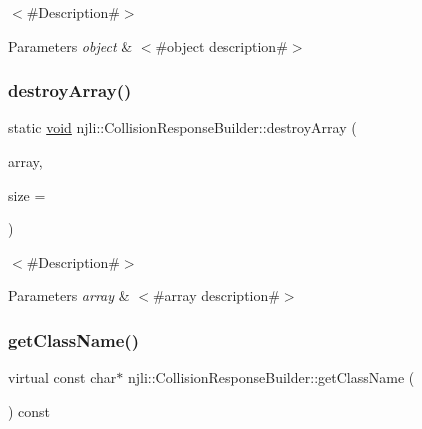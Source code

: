$<$\#\+Description\#$>$


\begin{DoxyParams}{Parameters}
{\em object} & $<$\#object description\#$>$ \\
\hline
\end{DoxyParams}
\mbox{\label{classnjli_1_1_collision_response_builder_aa7f266a43e3f731c87c81cf79212f639}} 
\subsubsection{\texorpdfstring{destroy\+Array()}{destroyArray()}}
{\footnotesize\ttfamily static \mbox{\hyperlink{_thread_8h_af1e856da2e658414cb2456cb6f7ebc66}{void}} njli\+::\+Collision\+Response\+Builder\+::destroy\+Array (\begin{DoxyParamCaption}\item[{\mbox{\hyperlink{classnjli_1_1_collision_response_builder}{Collision\+Response\+Builder}} $\ast$$\ast$}]{array,  }\item[{const \mbox{\hyperlink{_util_8h_a10e94b422ef0c20dcdec20d31a1f5049}{u32}}}]{size = {} }\end{DoxyParamCaption})\hspace{0.3cm}{\ttfamily [static]}}

$<$\#\+Description\#$>$


\begin{DoxyParams}{Parameters}
{\em array} & $<$\#array description\#$>$ \\
\hline
\end{DoxyParams}
\mbox{\label{classnjli_1_1_collision_response_builder_a50bd8b21b5a15b5459e830e865277f64}} 
\subsubsection{\texorpdfstring{get\+Class\+Name()}{getClassName()}}
{\footnotesize\ttfamily virtual const char$\ast$ njli\+::\+Collision\+Response\+Builder\+::get\+Class\+Name (\begin{DoxyParamCaption}{ }\end{DoxyParamCaption}) const\hspace{0.3cm}{\ttfamily [virtual]}}


